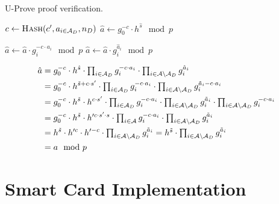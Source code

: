 \begin{algorithm}
  \caption{U-Prove proof verification.}
  \label{alg:UP-verify-proof}
  \addtolength{\baselineskip}{1mm}
  \begin{algorithmic}[1]
      \State $c \gets \Call{Hash}{c', a_{i \in \A_D}, n_D}$
      \State $\hat{a} \gets g_0^{-c} \cdot h^{\hat{s}} \mod p$
      
        \State $\hat{a} \gets \hat{a} \cdot g_i^{-c \cdot a_i} \mod p$
      \EndFor
        \State $\hat{a} \gets \hat{a} \cdot g_i^{\hat{a}_i} \mod p$
      \EndFor

        \Return {}
      \EndIf
      
      \Return {}
    \EndFunction
  \end{algorithmic}
\end{algorithm}

\begin{align*}
  \hat{a}
  & = g_0^{-c} \cdot h^{\hat{s}} 
    \cdot \textstyle\prod_{i \in \mathcal{A}_D} g_i^{-c \cdot a_i}
    \cdot \textstyle\prod_{i \in \mathcal{A} \setminus \mathcal{A}_D} g_i^{\hat{a}_i} \\
  & = g_0^{-c} \cdot h^{\tilde{s} + c \cdot s'} 
    \cdot \textstyle\prod_{i \in \mathcal{A}_D} g_i^{-c \cdot a_i}
    \cdot \textstyle\prod_{i \in \mathcal{A} \setminus \mathcal{A}_D} g_i^{\tilde{a}_i - c \cdot a_i} \\
  & = g_0^{-c} \cdot h^{\tilde{s}} \cdot h^{c \cdot s'} 
    \cdot \textstyle\prod_{i \in \mathcal{A}_D} g_i^{-c \cdot a_i}
    \cdot \textstyle\prod_{i \in \mathcal{A} \setminus \mathcal{A}_D} g_i^{\tilde{a}_i}
    \cdot \textstyle\prod_{i \in \mathcal{A} \setminus \mathcal{A}_D} g_i^{- c \cdot a_i} \\
  & = g_0^{-c} \cdot h^{\tilde{s}} \cdot h'^{c \cdot s' \cdot s} 
    \cdot \textstyle\prod_{i \in \mathcal{A}} g_i^{-c \cdot a_i}
    \cdot \textstyle\prod_{i \in \mathcal{A} \setminus \mathcal{A}_D} g_i^{\tilde{a}_i} \\
  & = h^{\tilde{s}} \cdot h'^{c} \cdot h'^{-c}
    \cdot \textstyle\prod_{i \in \mathcal{A} \setminus \mathcal{A}_D} g_i^{\tilde{a}_i}
  = h^{\tilde{s}} 
    \cdot \textstyle\prod_{i \in \mathcal{A} \setminus \mathcal{A}_D} g_i^{\tilde{a}_i} \\
  & = a \mod p
\end{align*}


\section{Smart Card Implementation}

